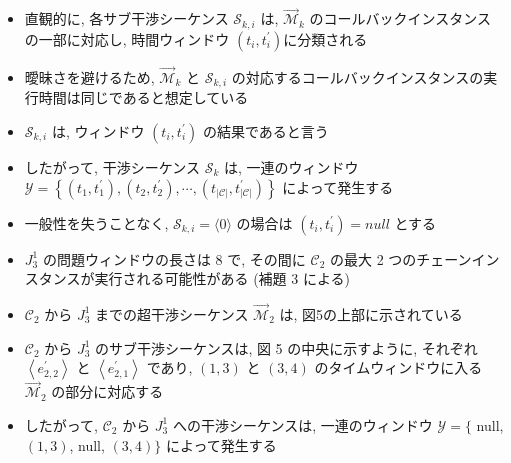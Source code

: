 \begin{frame}{}
    \begin{itemize}
        \item 直観的に, 各サブ干渉シーケンス $\mathcal{S}_{k, i}$ は, $\overrightarrow{\mathcal{M}}_{k}$ のコールバックインスタンスの一部に対応し, 時間ウィンドウ $\left(t_{i}, t_{i}^{\prime}\right)$に分類される
        \item 曖昧さを避けるため, $\overrightarrow{\mathcal{M}}_{k}$ と $\mathcal{S}_{k, i}$ の対応するコールバックインスタンスの実行時間は同じであると想定している
    \end{itemize}
\end{frame}

\begin{frame}{}
    \begin{itemize}
        \item $\mathcal{S}_{k, i}$ は, ウィンドウ $\left(t_{i}, t_{i}^{\prime}\right)$ の結果であると言う
        \item したがって, 干渉シーケンス $\mathcal{S}_{k}$ は, 一連のウィンドウ $\mathcal{Y}=\left\{\left(t_{1}, t_{1}^{\prime}\right),\left(t_{2}, t_{2}^{\prime}\right), \cdots,\left(t_{|\mathcal{C}|}, t_{|\mathcal{C}|}^{\prime}\right)\right\}$ によって発生する
        \item 一般性を失うことなく, $\mathcal{S}_{k, i}=\langle 0\rangle$ の場合は $\left(t_{i}, t_{i}^{\prime}\right)=n u l l$ とする
    \end{itemize}
\end{frame}

\begin{frame}{}
\end{frame}

\begin{frame}{}
    \begin{itemize}
        \item $J_{3}^{1}$ の問題ウィンドウの長さは 8 で, その間に $\mathcal{C}_{2}$ の最大 2 つのチェーンインスタンスが実行される可能性がある (補題 3 による)
        \item $\mathcal{C}_{2}$ から $J_{3}^{1}$ までの超干渉シーケンス $\overrightarrow{\mathcal{M}}_{2}$ は, 図5の上部に示されている
        \item $\mathcal{C}_{2}$ から $J_{3}^{1}$ のサブ干渉シーケンスは, 図 5 の中央に示すように, それぞれ $\left\langle e_{2,2}^{\prime}\right\rangle$ と $\left\langle e_{2,1}^{\prime}\right\rangle$ であり, $(1,3)$ と $(3,4)$ のタイムウィンドウに入る $\overrightarrow{\mathcal{M}}_{2}$ の部分に対応する
        \item したがって, $\mathcal{C}_{2}$ から $J_{3}^{1}$ への干渉シーケンスは, 一連のウィンドウ $\mathcal{Y}=\{$ null, $(1,3)$, null, $(3,4)\}$ によって発生する
    \end{itemize}
\end{frame}

